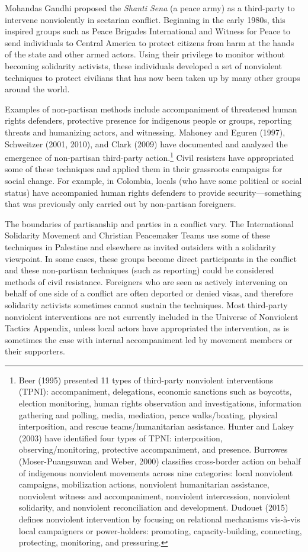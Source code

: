 \documentclass[twoside,a4paper,12pt,fleqn,openany]{extbook}
\begin{document}
Mohandas Gandhi proposed the \textit{Shanti Sena} (a peace army) as a third-party to intervene nonviolently in sectarian conflict. Beginning in the early 1980s, this inspired groups such as Peace Brigades International and Witness for Peace to send individuals to Central America to protect citizens from harm at the hands of the state and other armed actors. Using their privilege to monitor without becoming solidarity activists, these individuals developed a set of nonviolent techniques to protect civilians that has now been taken up by many other groups around the world.

Examples of non-partisan methods include accompaniment of threatened human rights defenders, protective presence for indigenous people or groups, reporting threats and humanizing actors, and witnessing. Mahoney and Eguren (1997), Schweitzer (2001, 2010), and Clark (2009) have documented and analyzed the emergence of non-partisan third-party action.\footnote{Beer (1995) presented 11 types of third-party nonviolent interventions (TPNI): accompaniment, delegations, economic sanctions such as boycotts, election monitoring, human rights observation and investigations, information gathering and polling, media, mediation, peace walks/boating, physical interposition, and rescue teams/humanitarian assistance. Hunter and Lakey (2003) have identified four types of TPNI: interposition, observing/monitoring, protective accompaniment, and presence. Burrowes (Moser-Puangsuwan and Weber, 2000) classifies cross-border action on behalf of indigenous nonviolent movements across nine categories: local nonviolent campaigns, mobilization actions, nonviolent humanitarian assistance, nonviolent witness and accompaniment, nonviolent intercession, nonviolent solidarity, and nonviolent reconciliation and development. Dudouet (2015) defines nonviolent intervention by focusing on relational mechanisms vis-à-vis local campaigners or power-holders: promoting, capacity-building, connecting, protecting, monitoring, and pressuring.} Civil resisters have appropriated some of these techniques and applied them in their grassroots campaigns for social change. For example, in Colombia, locals (who have some political or social status) have accompanied human rights defenders to provide security—something that was previously only carried out by non-partisan foreigners.

The boundaries of partisanship and parties in a conflict vary. The International Solidarity Movement and Christian Peacemaker Teams use some of these techniques in Palestine and elsewhere as invited outsiders with a solidarity viewpoint. In some cases, these groups become direct participants in the conflict and these non-partisan techniques (such as reporting) could be considered methods of civil resistance. Foreigners who are seen as actively intervening on behalf of one side of a conflict are often deported or denied visas, and therefore solidarity activists sometimes cannot sustain the techniques. Most third-party nonviolent interventions are not currently included in the Universe of Nonviolent Tactics Appendix, unless local actors have appropriated the intervention, as is sometimes the case with internal accompaniment led by movement members or their supporters.
\end{document}
